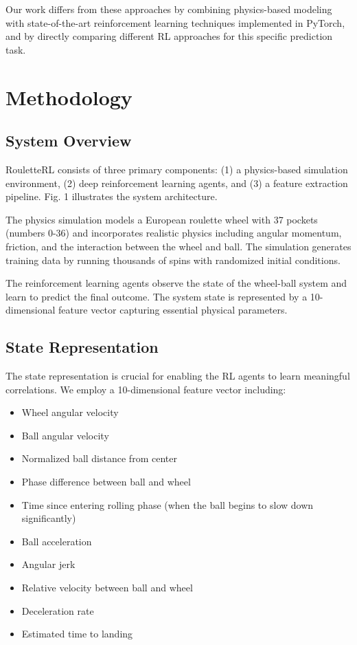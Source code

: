 \documentclass[conference]{IEEEtran}
\begin{document}
Our work differs from these approaches by combining physics-based modeling with state-of-the-art reinforcement learning techniques implemented in PyTorch, and by directly comparing different RL approaches for this specific prediction task.

\section{Methodology}

\subsection{System Overview}

RouletteRL consists of three primary components: (1) a physics-based simulation environment, (2) deep reinforcement learning agents, and (3) a feature extraction pipeline. Fig. 1 illustrates the system architecture.

The physics simulation models a European roulette wheel with 37 pockets (numbers 0-36) and incorporates realistic physics including angular momentum, friction, and the interaction between the wheel and ball. The simulation generates training data by running thousands of spins with randomized initial conditions.

The reinforcement learning agents observe the state of the wheel-ball system and learn to predict the final outcome. The system state is represented by a 10-dimensional feature vector capturing essential physical parameters.

\subsection{State Representation}

The state representation is crucial for enabling the RL agents to learn meaningful correlations. We employ a 10-dimensional feature vector including:

\begin{itemize}
    \item Wheel angular velocity
    \item Ball angular velocity
    \item Normalized ball distance from center
    \item Phase difference between ball and wheel
    \item Time since entering rolling phase (when the ball begins to slow down significantly)
    \item Ball acceleration
    \item Angular jerk
    \item Relative velocity between ball and wheel
    \item Deceleration rate
    \item Estimated time to landing
\end{itemize}
\end{document}
